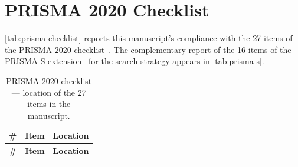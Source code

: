 \section{PRISMA 2020 Checklist}
\label{ap:prisma-checklist}

\autoref{tab:prisma-checklist} reports this manuscript's compliance with the 27 items of
the PRISMA 2020 checklist~\citep{page2021prisma}.
The complementary report of the 16 items of the PRISMA-S
extension~\citep{rethlefsen2021prismas} for the search strategy appears in
\autoref{tab:prisma-s}.

\begin{longtable}{p{0.5cm}p{4.5cm}p{8.5cm}}
\caption{PRISMA 2020 checklist --- location of the 27 items in the manuscript.}
\label{tab:prisma-checklist} \\
\toprule
\textbf{\#} & \textbf{Item} & \textbf{Location} \\
\midrule
\endfirsthead
\toprule
\textbf{\#} & \textbf{Item} & \textbf{Location} \\
\midrule
\endhead
\bottomrule
\endfoot


\end{longtable}
